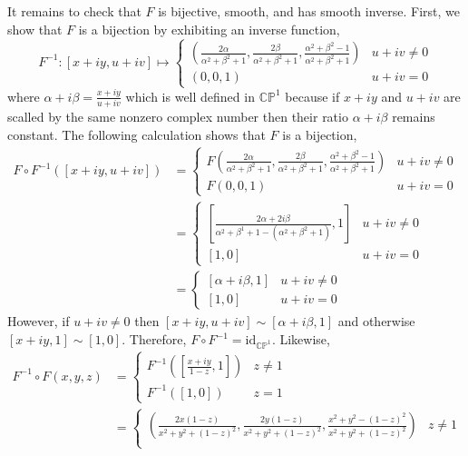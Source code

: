 \documentclass[12pt]{extarticle}
\newcommand{\id}{\mathrm{id}}
\newcommand{\CP}{\mathbb{CP}}
\begin{document}
\begin{enumerate}
It remains to check that $F$ is bijective, smooth, and has smooth inverse. First, we show that $F$ is a bijection by exhibiting an inverse function,
\[ F^{-1} : [x + iy, u + iv] \mapsto
\begin{cases}
\left(\frac{2 \alpha}{\alpha^2 + \beta^2 + 1}, \frac{2 \beta}{\alpha^2 + \beta^2 + 1}, \frac{\alpha^2 + \beta^2 - 1}{\alpha^2 + \beta^2 + 1} \right) & u + iv \neq 0\\
(0, 0, 1) & u + iv = 0
\end{cases}
\]
where $\alpha + i \beta = \frac{x + iy}{u + i v}$ which is well defined in $\CP^1$ because if $x + iy$ and $u + iv$ are scalled by the same nonzero complex number then their ratio $\alpha + i \beta$ remains constant. The following calculation shows that $F$ is a bijection,
\begin{align*}
F \circ F^{-1}([x + iy, u + iv]) & = 
\begin{cases}
F\left(\frac{2 \alpha}{\alpha^2 + \beta^2 + 1}, \frac{2 \beta}{\alpha^2 + \beta^2 + 1}, \frac{\alpha^2 + \beta^2 - 1}{\alpha^2 + \beta^2 + 1} \right) & u + iv \neq 0
\\
F(0, 0, 1) & u + iv = 0 
\end{cases}
\\
& = 
\begin{cases}
\left[ \frac{2 \alpha + 2 i \beta}{\alpha^2 + \beta^1 + 1 - (\alpha^2 + \beta^2 + 1)}, 1 \right]  & u + iv \neq 0
\\
[1, 0] & u + iv = 0 
\end{cases}
\\
& =  
\begin{cases}
\left[ \alpha + i \beta, 1 \right]  & u + iv \neq 0
\\
[1, 0] & u + iv = 0 
\end{cases}
\end{align*}
However, if $u + i v \neq 0$ then $[x + iy, u + iv] \sim [\alpha + i \beta, 1]$ and otherwise $[x + i y, 1] \sim [1, 0]$. Therefore, $F \circ F^{-1} = \id_{\CP^1}$. Likewise,
\begin{align*}
F^{-1} \circ F(x, y, z) & =
\begin{cases}
F^{-1}\left(\left[ \frac{x + i y}{1 - z}, 1 \right] \right) & z \neq 1 \\
F^{-1}([1, 0]) & z = 1
\end{cases}
\\ 
& = 
\begin{cases}
\left( \frac{2x ( 1 - z)}{x^2 + y^2 + (1 - z)^2}, \frac{2y ( 1- z)}{x^2 + y^2 + (1 - z)^2}, \frac{x^2 + y^2 - (1 - z)^2}{x^2 + y^2 + (1 - z)^2} \right) & z \neq 1 \\

\end{cases}
\end{align*}
\end{enumerate}
\end{document}
